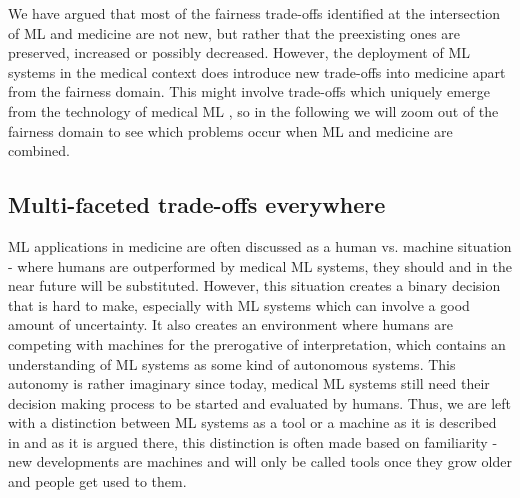 
We have argued that most of the fairness trade-offs identified at the intersection of ML and medicine are not new, but rather that the preexisting ones are preserved, increased or possibly decreased. However, the deployment of ML systems in the medical context does introduce new trade-offs into medicine apart from the fairness domain. This might involve trade-offs which uniquely emerge from the technology of medical ML \cite{Dijkstra2020}, so in the following we will zoom out of the fairness domain to see which problems occur when ML and medicine are combined. 


\subsection{Multi-faceted trade-offs everywhere}

ML applications in medicine are often discussed as a human vs. machine situation - where humans are outperformed by medical ML systems, they should and in the near future will be substituted. However, this situation creates a binary decision that is hard to make, especially with ML systems which can involve a good amount of uncertainty. It also creates an environment where humans are competing with machines for the prerogative of interpretation, which contains an understanding of ML systems as some kind of autonomous systems. This autonomy is rather imaginary since today, medical ML systems still need their decision making process to be started and evaluated by humans. Thus, we are left with a distinction between ML systems as a tool or a machine as it is described in \cite{Williamson2021} and as it is argued there, this distinction is often made based on familiarity - new developments are machines and will only be called tools once they grow older and people get used to them. 

